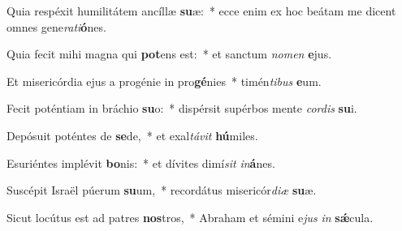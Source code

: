 \item Quia respéxit humilitátem ancíllæ \textbf{su}æ:~* ecce enim ex hoc beátam me dicent omnes gene\textit{ra}\textit{ti}\textbf{ó}nes.
\item Quia fecit mihi magna qui \textbf{pot}ens est:~* et sanctum \textit{no}\textit{men} \textbf{e}jus.
\item Et misericórdia ejus a progénie in pro\textbf{gé}nies~* timén\textit{ti}\textit{bus} \textbf{e}um.
\item Fecit poténtiam in bráchio \textbf{su}o:~* dispérsit supérbos mente \textit{cor}\textit{dis} \textbf{su}i.
\item Depósuit poténtes de \textbf{se}de,~* et exal\textit{tá}\textit{vit} \textbf{hú}miles.
\item Esuriéntes implévit \textbf{bo}nis:~* et dívites dimí\textit{sit} \textit{in}\textbf{á}nes.
\item Suscépit Israël púerum \textbf{su}um,~* recordátus misericór\textit{di}\textit{æ} \textbf{su}æ.
\item Sicut locútus est ad patres \textbf{nos}tros,~* Abraham et sémini e\textit{jus} \textit{in} \textbf{sǽ}cula.
